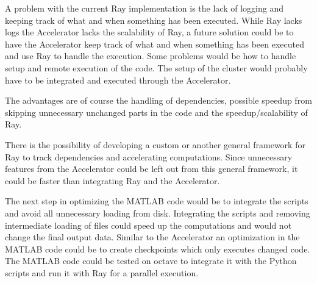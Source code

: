 \documentclass[12pt, a4paper]{article}
\begin{document}
A problem with the current Ray implementation is the lack of logging and keeping track of what and when something has been executed.
While Ray lacks logs the Accelerator lacks the scalability of Ray, a future solution could be to have the Accelerator keep track of what and when something has been executed and use Ray to handle the execution.
Some problems would be how to handle setup and remote execution of the code.
The setup of the cluster would probably have to be integrated and executed through the Accelerator.

The advantages are of course the handling of dependencies, possible speedup from skipping unnecessary unchanged parts in the code and the speedup/scalability of Ray.

There is the possibility of developing a custom or another general framework for Ray to track dependencies and accelerating computations.
Since unnecessary features from the Accelerator could be left out from this general framework, it could be faster than integrating Ray and the Accelerator.

The next step in optimizing the MATLAB code would be to integrate the scripts and avoid all unnecessary loading from disk.
Integrating the scripts and removing intermediate loading of files could speed up the computations and would not change the final output data.
Similar to the Accelerator an optimization in the MATLAB code could be to create checkpoints which only executes changed code.
The MATLAB code could be tested on octave to integrate it with the Python scripts and run it with Ray for a parallel execution.



\end{document}
